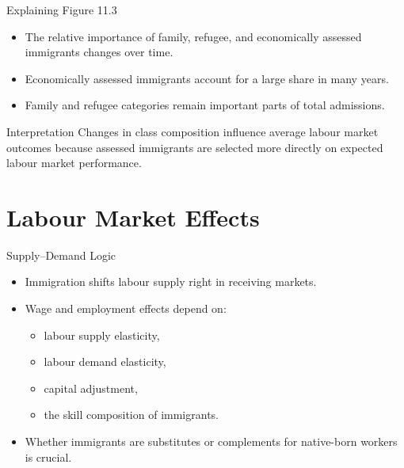 \documentclass[aspectratio=169]{beamer}
\begin{document}
\begin{frame}{Explaining Figure 11.3}
\transfade
\begin{itemize}
  \item The relative importance of family, refugee, and economically assessed immigrants changes over time.
  \item Economically assessed immigrants account for a large share in many years.
  \item Family and refugee categories remain important parts of total admissions.
\end{itemize}

\begin{block}{Interpretation}
Changes in class composition influence average labour market outcomes because assessed immigrants are selected more directly on expected labour market performance.
\end{block}
\end{frame}

\section{Labour Market Effects}

\begin{frame}{Supply--Demand Logic}
\transfade
\begin{itemize}
  \item Immigration shifts labour supply right in receiving markets.
  \item Wage and employment effects depend on:
  \begin{itemize}
    \item labour supply elasticity,
    \item labour demand elasticity,
    \item capital adjustment,
    \item the skill composition of immigrants.
  \end{itemize}
  \item Whether immigrants are substitutes or complements for native-born workers is crucial.
\end{itemize}
\end{frame}
\end{document}

